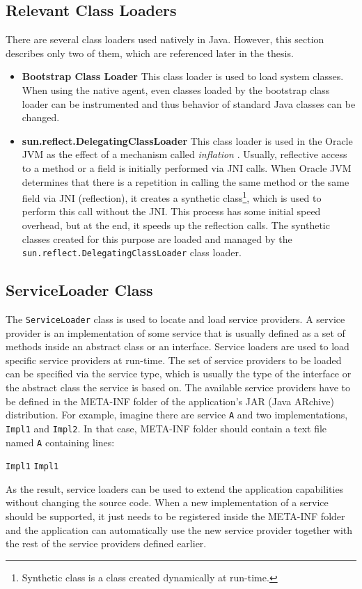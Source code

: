 \subsection{Relevant Class Loaders}
There are several class loaders used natively in Java. However, this section describes only two of them, which are referenced later in the thesis. 

\begin{itemize}
	\item\textbf{Bootstrap Class Loader} \newline
	This class loader is used to load system classes. When using the native agent, even classes loaded by the bootstrap class loader can be instrumented and thus behavior of standard Java classes can be changed.
	
	\item  \textbf{sun.reflect.DelegatingClassLoader} \newline
	This class loader is used in the Oracle JVM as the effect of a mechanism called \textit{inflation} \cite{inflation}. Usually, reflective access to a method or a field is initially performed via JNI calls. When Oracle JVM determines that there is a repetition in calling the same method or the same field via JNI (reflection), it creates a synthetic class\footnote{Synthetic class is a class created dynamically at run-time.}, which is used to perform this call without the JNI. This process has some initial speed overhead, but at the end, it speeds up the reflection calls. The synthetic classes created for this purpose are loaded and managed by the \texttt{sun.reflect.DelegatingClassLoader} class loader.
\end{itemize}
\subsection{ServiceLoader Class}
The \texttt{ServiceLoader} class is used to locate and load service providers. A service provider is an implementation of some service that is usually defined as a set of methods inside an abstract class or an interface. Service loaders are used to load specific service providers at run-time. The set of service providers to be loaded can be specified via the service type, which is usually the type of the interface or the abstract class the service is based on. The available service providers have to be defined in the META-INF folder of the application's JAR (Java ARchive) distribution. For example, imagine there are service \texttt{A} and two implementations, \texttt{Impl1} and \texttt{Impl2}. In that case, META-INF folder should contain a text file named \texttt{A} containing lines:
\begin{center}
\texttt{Impl1} \newline
\texttt{Impl1}  \newline
\end{center}
As the result, service loaders can be used to extend the application capabilities without changing the source code. When a new implementation of a service should be supported, it just needs to be registered inside the META-INF folder and the application can automatically use the new service provider together with the rest of the service providers defined earlier.
